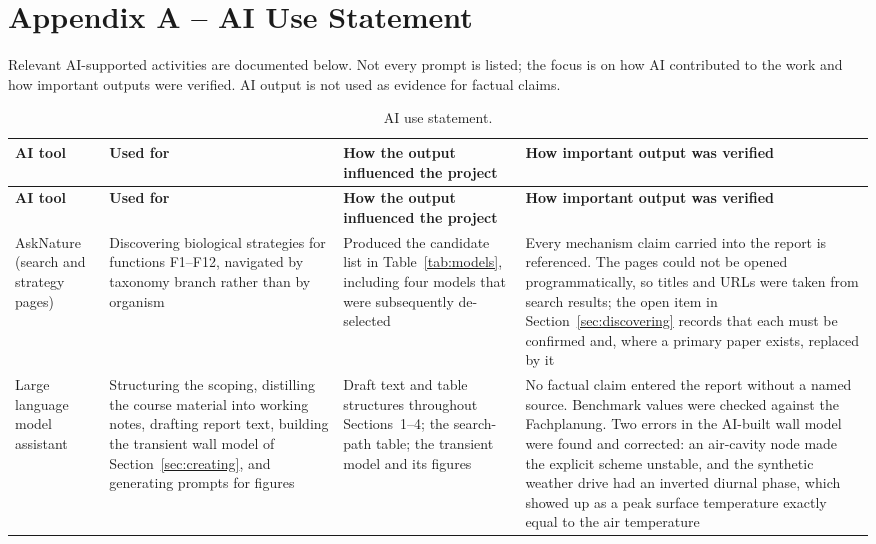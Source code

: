 \section*{Appendix A -- AI Use Statement}
\setcounter{table}{0}
\renewcommand{\thetable}{A.\arabic{table}}

Relevant AI-supported activities are documented below. Not every prompt is
listed; the focus is on how AI contributed to the work and how important
outputs were verified. AI output is not used as evidence for factual claims.

\begin{longtable}{L{2.4cm} L{3.0cm} L{4.6cm} L{4.2cm}}
\caption{AI use statement.}\label{tab:aiuse}\\
\toprule
\textbf{AI tool} & \textbf{Used for} & \textbf{How the output influenced the project} & \textbf{How important output was verified} \\
\midrule
\endfirsthead
\toprule
\textbf{AI tool} & \textbf{Used for} & \textbf{How the output influenced the project} & \textbf{How important output was verified} \\
\midrule
\endhead
\bottomrule
\endfoot

AskNature (search and strategy pages) & Discovering biological strategies for functions F1--F12, navigated by taxonomy branch rather than by organism &
Produced the candidate list in Table~\ref{tab:models}, including four models that were subsequently de-selected &
Every mechanism claim carried into the report is referenced. The pages could not be opened programmatically, so titles and URLs were taken from search results; the open item in Section~\ref{sec:discovering} records that each must be confirmed and, where a primary paper exists, replaced by it \\

Large language model assistant & Structuring the scoping, distilling the course material into working notes, drafting report text, building the transient wall model of Section~\ref{sec:creating}, and generating prompts for figures &
Draft text and table structures throughout Sections~1--4; the search-path table; the transient model and its figures &
No factual claim entered the report without a named source. Benchmark values were checked against the Fachplanung. Two errors in the AI-built wall model were found and corrected: an air-cavity node made the explicit scheme unstable, and the synthetic weather drive had an inverted diurnal phase, which showed up as a peak surface temperature exactly equal to the air temperature \\


\end{longtable}
